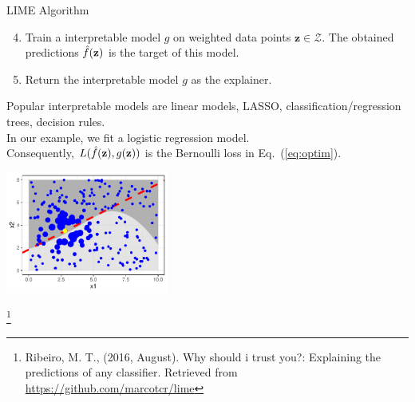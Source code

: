 \documentclass[11pt,compress,t,notes=noshow, xcolor=table]{beamer}
\newcommand{\zv}{\mathbf{z}}
\newcommand{\Zspace}{\mathcal{Z}}
\begin{document}
\begin{vbframe}{LIME Algorithm}
		\framebreak
		\begin{enumerate}
			\setcounter{enumi}{3}
		\item Train a interpretable model $g$ on weighted data points $\zv \in \Zspace$. The obtained predictions $\fh(\zv)$ is the target of this model.
		\item Return the interpretable model $g$ as the explainer. \\[0.3cm]
			\end{enumerate}
		Popular interpretable models are linear models, LASSO, classification/regression trees, decision rules. \\
		In our example, we fit a logistic regression model. \\Consequently, $L(\fh(\zv), g(\zv))$  is the Bernoulli loss in Eq.~(\ref{eq:optim}). 
		\begin{center}
			\includegraphics[width=0.4\textwidth]{figure/lime5}
		\end{center}
		\footnote[frame]{Ribeiro, M. T., (2016, August). Why should i trust you?: Explaining the predictions of any classifier. Retrieved from \url{https://github.com/marcotcr/lime}}
\end{vbframe}
\end{document}
